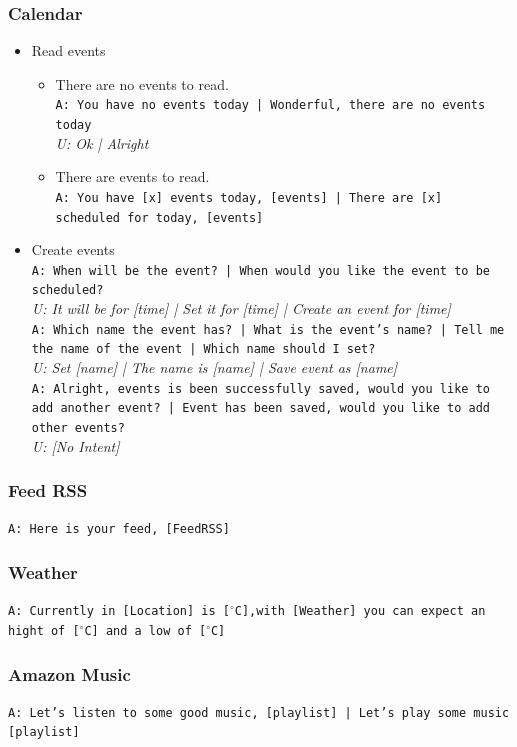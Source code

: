 \subsubsection{Calendar}
\begin{itemize}
	\item Read events
	\begin{itemize}
		\item There are no events to read.\\
		\texttt{A: You have no events today | Wonderful, there are no events today}\\
		\textit{U: Ok | Alright}
		\item There are events to read.\\
		\texttt{A: You have [x] events today, [events] | There are [x] scheduled for today, [events]}
	\end{itemize}
	\item Create events\\
	\texttt{A: When will be the event? | When would you like the event to be scheduled?}\\
	\textit{U: It will be for [time] | Set it for [time] | Create an event for [time]}\\
	\texttt{A: Which name the event has? | What is the event's name? | Tell me the name of the event | Which name should I set?}\\
	\textit{U: Set [name] | The name is [name] | Save event as [name]}\\
	\texttt{A: Alright, events is been successfully saved, would you like to add another event? | Event has been saved, would you like to add other events?}\\
	\textit{U: [No Intent]}
\end{itemize}

\subsubsection{Feed RSS}
\texttt{A: Here is your feed, [FeedRSS]}

\subsubsection{Weather}
\texttt{A: Currently in [Location] is [$^\circ$C],with [Weather] you can expect an hight of [$^\circ$C] and a low of [$^\circ$C]}

\subsubsection{Amazon Music}
\texttt{A: Let's listen to some good music, [playlist] | Let's play some music [playlist]}

